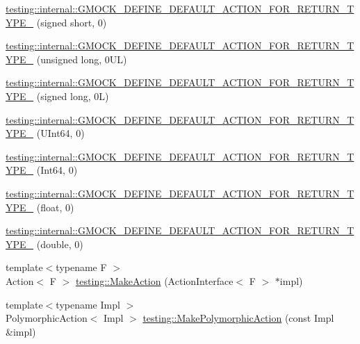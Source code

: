 \begin{DoxyCompactItemize}
\item 
\hyperlink{namespacetesting_1_1internal_ae6ea5db83b290e2412f321c3b1eb8c47}{testing\+::internal\+::\+G\+M\+O\+C\+K\+\_\+\+D\+E\+F\+I\+N\+E\+\_\+\+D\+E\+F\+A\+U\+L\+T\+\_\+\+A\+C\+T\+I\+O\+N\+\_\+\+F\+O\+R\+\_\+\+R\+E\+T\+U\+R\+N\+\_\+\+T\+Y\+P\+E\+\_\+} (signed short, 0)
\item 
\hyperlink{namespacetesting_1_1internal_a1f4167b954a7ff0074ce8a5bb855f86f}{testing\+::internal\+::\+G\+M\+O\+C\+K\+\_\+\+D\+E\+F\+I\+N\+E\+\_\+\+D\+E\+F\+A\+U\+L\+T\+\_\+\+A\+C\+T\+I\+O\+N\+\_\+\+F\+O\+R\+\_\+\+R\+E\+T\+U\+R\+N\+\_\+\+T\+Y\+P\+E\+\_\+} (unsigned long, 0\+U\+L)
\item 
\hyperlink{namespacetesting_1_1internal_ad8804e25537427755c324ab03a72e776}{testing\+::internal\+::\+G\+M\+O\+C\+K\+\_\+\+D\+E\+F\+I\+N\+E\+\_\+\+D\+E\+F\+A\+U\+L\+T\+\_\+\+A\+C\+T\+I\+O\+N\+\_\+\+F\+O\+R\+\_\+\+R\+E\+T\+U\+R\+N\+\_\+\+T\+Y\+P\+E\+\_\+} (signed long, 0\+L)
\item 
\hyperlink{namespacetesting_1_1internal_ad2efcdbd12c7c020745b87bcc0997809}{testing\+::internal\+::\+G\+M\+O\+C\+K\+\_\+\+D\+E\+F\+I\+N\+E\+\_\+\+D\+E\+F\+A\+U\+L\+T\+\_\+\+A\+C\+T\+I\+O\+N\+\_\+\+F\+O\+R\+\_\+\+R\+E\+T\+U\+R\+N\+\_\+\+T\+Y\+P\+E\+\_\+} (U\+Int64, 0)
\item 
\hyperlink{namespacetesting_1_1internal_ab427739121a380a7934bda96153f053d}{testing\+::internal\+::\+G\+M\+O\+C\+K\+\_\+\+D\+E\+F\+I\+N\+E\+\_\+\+D\+E\+F\+A\+U\+L\+T\+\_\+\+A\+C\+T\+I\+O\+N\+\_\+\+F\+O\+R\+\_\+\+R\+E\+T\+U\+R\+N\+\_\+\+T\+Y\+P\+E\+\_\+} (Int64, 0)
\item 
\hyperlink{namespacetesting_1_1internal_a71c697e5b567365fd3ff6c720769633b}{testing\+::internal\+::\+G\+M\+O\+C\+K\+\_\+\+D\+E\+F\+I\+N\+E\+\_\+\+D\+E\+F\+A\+U\+L\+T\+\_\+\+A\+C\+T\+I\+O\+N\+\_\+\+F\+O\+R\+\_\+\+R\+E\+T\+U\+R\+N\+\_\+\+T\+Y\+P\+E\+\_\+} (float, 0)
\item 
\hyperlink{namespacetesting_1_1internal_a7ba92aa33f4968c902623cd02e445020}{testing\+::internal\+::\+G\+M\+O\+C\+K\+\_\+\+D\+E\+F\+I\+N\+E\+\_\+\+D\+E\+F\+A\+U\+L\+T\+\_\+\+A\+C\+T\+I\+O\+N\+\_\+\+F\+O\+R\+\_\+\+R\+E\+T\+U\+R\+N\+\_\+\+T\+Y\+P\+E\+\_\+} (double, 0)
\item 
{\footnotesize template$<$typename F $>$ }\\Action$<$ F $>$ \hyperlink{namespacetesting_ae6b9960db2b2685e043ce5215291f5b8}{testing\+::\+Make\+Action} (Action\+Interface$<$ F $>$ $\ast$impl)
\item 
{\footnotesize template$<$typename Impl $>$ }\\Polymorphic\+Action$<$ Impl $>$ \hyperlink{namespacetesting_a36bd06c5ea972c6df0bd9f40a7a94c65}{testing\+::\+Make\+Polymorphic\+Action} (const Impl \&impl)

\end{DoxyCompactItemize}
